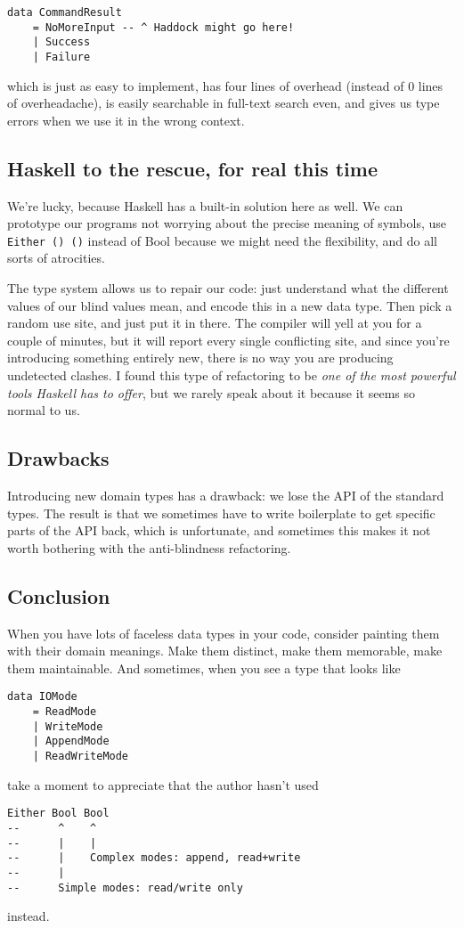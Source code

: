 \begin{verbatim}
data CommandResult
    = NoMoreInput -- ^ Haddock might go here!
    | Success
    | Failure
\end{verbatim}
which is just as easy to implement, has four lines of overhead (instead of 0 lines of overheadache), is easily searchable in full-text search even, and gives us type errors when we use it in the wrong context.




\subsection{Haskell to the rescue, for real this time}

We're lucky, because Haskell has a built-in solution here as well. We can prototype our programs not worrying about the precise meaning of symbols, use \texttt{Either () ()} instead of Bool because we might need the flexibility, and do all sorts of atrocities.

The type system allows us to repair our code: just understand what the different values of our blind values mean, and encode this in a new data type. Then pick a random use site, and just put it in there. The compiler will yell at you for a couple of minutes, but it will report every single conflicting site, and since you're introducing something entirely new, there is no way you are producing undetected clashes. I found this type of refactoring to be \textit{one of the most powerful tools Haskell has to offer}, but we rarely speak about it because it seems so normal to us.



\subsection{Drawbacks}

Introducing new domain types has a drawback: we lose the API of the standard types. The result is that we sometimes have to write boilerplate to get specific parts of the API back, which is unfortunate, and sometimes this makes it not worth bothering with the anti-blindness refactoring.



\subsection{Conclusion}


When you have lots of faceless data types in your code, consider painting them with their domain meanings. Make them distinct, make them memorable, make them maintainable. And sometimes, when you see a type that looks like

\begin{verbatim}
data IOMode
    = ReadMode
    | WriteMode
    | AppendMode
    | ReadWriteMode
\end{verbatim}
take a moment to appreciate that the author hasn't used

\begin{verbatim}
Either Bool Bool
--      ^    ^
--      |    |
--      |    Complex modes: append, read+write
--      |
--      Simple modes: read/write only
\end{verbatim}
instead.
